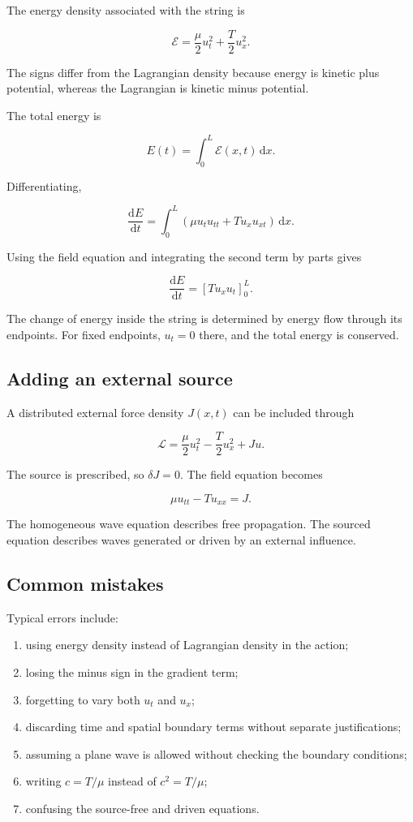 The energy density associated with the string is

\[
\boxed{
\mathcal{E}
=
\frac{\mu}{2}u_{t}^{2}
+
\frac{T}{2}u_{x}^{2}
}.
\]

The signs differ from the Lagrangian density because energy is kinetic plus potential, whereas the Lagrangian is kinetic minus potential.

The total energy is

\[
E(t)
=
\int_{0}^{L}
\mathcal{E}(x,t)
\,\mathrm{d}x.
\]

Differentiating,

\[
\frac{\mathrm{d}E}{\mathrm{d}t}
=
\int_{0}^{L}
\left(
\mu u_{t}u_{tt}
+
T u_{x}u_{xt}
\right)
\,\mathrm{d}x.
\]

Using the field equation and integrating the second term by parts gives

\[
\boxed{
\frac{\mathrm{d}E}{\mathrm{d}t}
=
\left[T u_{x}u_{t}\right]_{0}^{L}
}.
\]

The change of energy inside the string is determined by energy flow through its endpoints. For fixed endpoints, \(u_{t}=0\) there, and the total energy is conserved.

\subsection{Adding an external source}

A distributed external force density \(J(x,t)\) can be included through

\[
\mathcal{L}
=
\frac{\mu}{2}u_{t}^{2}
-
\frac{T}{2}u_{x}^{2}
+
J u.
\]

The source is prescribed, so \(\delta J=0\). The field equation becomes

\[
\boxed{
\mu u_{tt}-Tu_{xx}=J
}.
\]

The homogeneous wave equation describes free propagation. The sourced equation describes waves generated or driven by an external influence.

\subsection{Common mistakes}

Typical errors include:

\begin{enumerate}
    \item using energy density instead of Lagrangian density in the action;
    \item losing the minus sign in the gradient term;
    \item forgetting to vary both \(u_{t}\) and \(u_{x}\);
    \item discarding time and spatial boundary terms without separate justifications;
    \item assuming a plane wave is allowed without checking the boundary conditions;
    \item writing \(c=T/\mu\) instead of \(c^{2}=T/\mu\);
    \item confusing the source-free and driven equations.
\end{enumerate}

